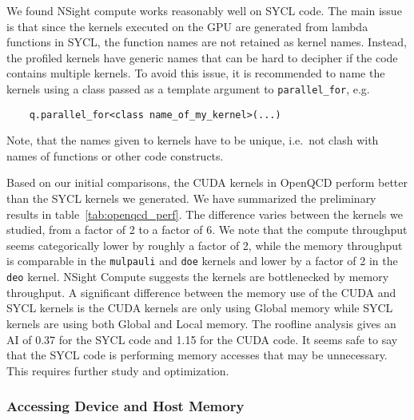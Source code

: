 \documentclass[../main]{subfiles}
\begin{document}
We found NSight compute works reasonably well on SYCL code.
The main issue is that since the kernels executed on the GPU are generated from lambda functions in SYCL, the function names are not retained as kernel names.
Instead, the profiled kernels have generic names that can be hard to decipher if the code contains multiple kernels.
To avoid this issue, it is recommended to name the kernels using a class passed as a template argument to \verb #parallel_for#, e.g.
\begin{verbatim}
    q.parallel_for<class name_of_my_kernel>(...)
\end{verbatim}
Note, that the names given to kernels have to be unique, i.e.\ not clash with names of functions or other code constructs.

Based on our initial comparisons, the CUDA kernels in OpenQCD perform better than the SYCL kernels we generated.
We have summarized the preliminary results in table~\ref{tab:openqcd_perf}.
The difference varies between the kernels we studied, from a factor of 2 to a factor of 6.
We note that the compute throughput seems categorically lower by roughly a factor of 2, while the memory throughput is comparable in the \verb #mulpauli# and \verb #doe# kernels and lower by a factor of 2 in the \verb #deo# kernel.
NSight Compute suggests the kernels are bottlenecked by memory throughput.
A significant difference between the memory use of the CUDA and SYCL kernels is the CUDA kernels are only using Global memory while SYCL kernels are using both Global and Local memory.
The roofline analysis gives an AI of 0.37 for the SYCL code and 1.15 for the CUDA code.
It seems safe to say that the SYCL code is performing memory accesses that may be unnecessary.
This requires further study and optimization.

\subsubsection{Accessing Device and Host Memory}\label{sec:openqcd_memoryaccess}

\end{document}
